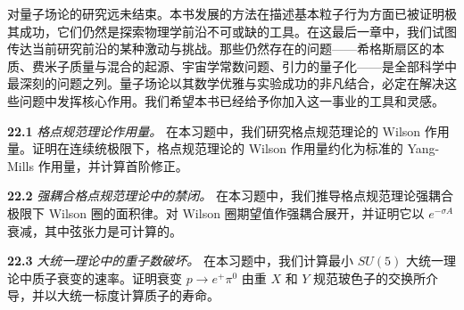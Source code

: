 对量子场论的研究远未结束。本书发展的方法在描述基本粒子行为方面已被证明极其成功，它们仍然是探索物理学前沿不可或缺的工具。在这最后一章中，我们试图传达当前研究前沿的某种激动与挑战。那些仍然存在的问题——希格斯扇区的本质、费米子质量与混合的起源、宇宙学常数问题、引力的量子化——是全部科学中最深刻的问题之列。量子场论以其数学优雅与实验成功的非凡结合，必定在解决这些问题中发挥核心作用。我们希望本书已经给予你加入这一事业的工具和灵感。

\problems

\textbf{22.1} \emph{格点规范理论作用量。} 在本习题中，我们研究格点规范理论的 Wilson 作用量。证明在连续统极限下，格点规范理论的 Wilson 作用量约化为标准的 Yang-Mills 作用量，并计算首阶修正。

\textbf{22.2} \emph{强耦合格点规范理论中的禁闭。} 在本习题中，我们推导格点规范理论强耦合极限下 Wilson 圈的面积律。对 Wilson 圈期望值作强耦合展开，并证明它以 $e^{-\sigma A}$ 衰减，其中弦张力是可计算的。

\textbf{22.3} \emph{大统一理论中的重子数破坏。} 在本习题中，我们计算最小 $SU(5)$ 大统一理论中质子衰变的速率。证明衰变 $p\to e^{+}\pi^0$ 由重 $X$ 和 $Y$ 规范玻色子的交换所介导，并以大统一标度计算质子的寿命。
